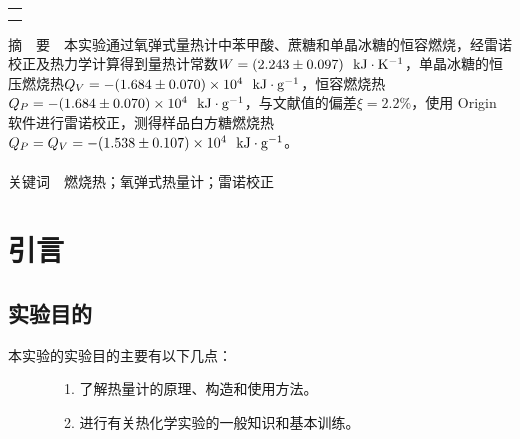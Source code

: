 \documentclass[12pt]{article}
\begin{document}
\begin{titlepage}
\begin{center}
            \begin{tabular*}{\textwidth}{c}
                \\ %
                \\ %
                \\ %
                \hline %
            \end{tabular*}
        \end{center}
        \textsf{\textcolor{BrickRed}{摘\ \ 要}}\ \  本实验通过氧弹式量热计中苯甲酸、蔗糖和单晶冰糖的恒容燃烧，经雷诺校正及热力学计算得到量热计常数$W=(2.243\pm 0.097)\ \ {\rm kJ\cdot K^{-1}}$，单晶冰糖的恒压燃烧热$Q_{V}=-(1.684\pm 0.070)\times 10^{4}\ \ {\rm kJ\cdot g^{-1}}$，恒容燃烧热$Q_{P}=-(1.684\pm 0.070)\times 10^{4}\ \ {\rm kJ\cdot g^{-1}}$，与文献值的偏差$\xi=2.2\%$，使用 Origin 软件进行雷诺校正，测得样品白方糖燃烧热$Q_{P}=Q_{V}=-(1.538\pm 0.107)\times 10^{4}\ \ {\rm kJ\cdot g^{-1}}$。
        \\
        \\
        \textsf{\textcolor{BrickRed}{关键词}}\ \ 燃烧热；氧弹式热量计；雷诺校正
    \end{titlepage}

    \section{引言}
		\subsection{实验目的}
			本实验的实验目的主要有以下几点\citealp{physchemlab}：\par
			\ \ \ \ \ \ \ \ 1. 了解热量计的原理、构造和使用方法。\par
			\ \ \ \ \ \ \ \	2. 进行有关热化学实验的一般知识和基本训练。\par
\end{document}

